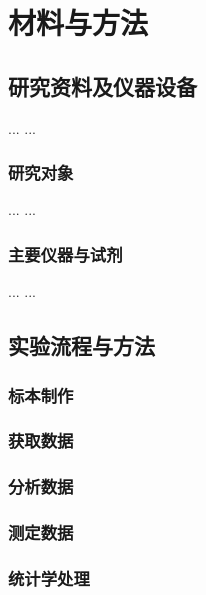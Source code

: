 \chapter{材料与方法} \label{chap:materials}
\section{研究资料及仪器设备} \label{sec:materials:obj-dev}

... ...

\subsection{研究对象}\label{subsec:materials:obj-dev:obj}
... ...

\subsection{主要仪器与试剂}\label{subsec:materials:obj-dev:dev}

... ...

\section{实验流程与方法}\label{sec:materials:proc-method}
\subsection{标本制作}\label{subsec:materials:proc-method:specimens}
\subsection{获取数据}\label{subsec:materials:proc-method:getdata}
\subsection{分析数据}\label{subsec:materials:proc-method:analysisdata}
\subsection{测定数据}\label{subsec:materials:proc-method:measured data}
\subsection{统计学处理 }\label{subsec:materials:proc-method:statistic}


